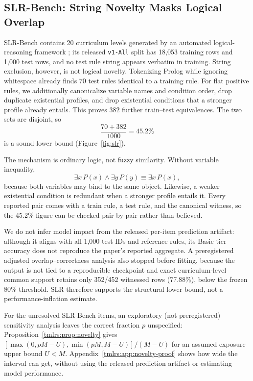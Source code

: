 \documentclass[twoside,11pt]{article}
\begin{document}
\subsection{SLR-Bench: String Novelty Masks Logical Overlap}
\label{sec:slr}

SLR-Bench contains 20 curriculum levels generated by an automated
logical-reasoning framework \citep{helff2026slr}; its released
\texttt{v1-All} split has 18,053 training rows and 1,000 test rows, and no
test rule string appears verbatim in training.  String exclusion, however,
is not logical novelty.  Tokenizing Prolog while ignoring whitespace
already finds 70 test rules identical to a training rule.  For flat
positive rules, we additionally canonicalize variable names and condition
order, drop duplicate existential profiles, and drop existential conditions
that a stronger profile already entails.  This proves 382 further
train--test equivalences.  The two sets are disjoint, so
\begin{equation}
\frac{70+382}{1000}=45.2\%
\end{equation}
is a sound lower bound (Figure~\ref{fig:slr}).

The mechanism is ordinary logic, not fuzzy similarity.  Without variable
inequality,
\begin{equation}
\exists x\,P(x)\land\exists y\,P(y)
\equiv
\exists x\,P(x),
\end{equation}
because both variables may bind to the same object.  Likewise, a weaker
existential condition is redundant when a stronger profile entails it.
Every reported pair comes with a train rule, a test rule, and the canonical
witness, so the 45.2\% figure can be checked pair by pair rather than
believed.

We do not infer model impact from the released per-item prediction
artifact: although it aligns with all 1,000 test IDs and reference rules,
its Basic-tier accuracy does not reproduce the paper's reported aggregate.
A preregistered adjusted overlap--correctness analysis also stopped before
fitting, because the output is not tied to a reproducible checkpoint and
exact curriculum-level common support retains only 352/452 witnessed rows
(77.88\%), below the frozen 80\% threshold.  SLR therefore supports the
structural lower bound, not a performance-inflation estimate.

For the \TTenM{} unresolved SLR-Bench items, an exploratory
(not preregistered) sensitivity analysis leaves the correct fraction $p$
unspecified: Proposition~\ref{tmlrs:prop:novelty} gives
$[\max(0,pM-U),\min(pM,M-U)]/(M-U)$ for an assumed exposure upper bound
$U<M$.  Appendix~\ref{tmlrs:app:novelty-proof} shows how wide the interval
can get, without using the released prediction artifact or estimating model
performance.
\end{document}
